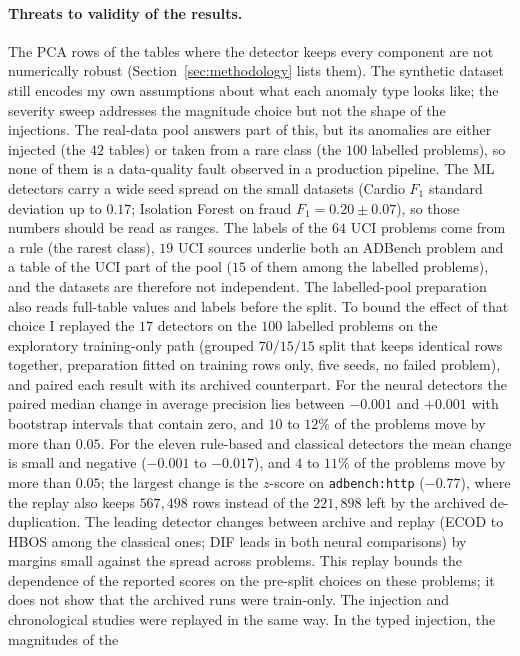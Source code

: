 \documentclass[conference]{IEEEtran}
\begin{document}
\paragraph{Threats to validity of the results.} The PCA rows of the tables where the
detector keeps every component are not numerically robust (Section~\ref{sec:methodology} lists
them). The synthetic dataset still encodes my
own assumptions about what each anomaly type looks like; the severity
sweep addresses the magnitude choice but not the shape of the
injections. The real-data pool answers part of this, but its anomalies are either
injected (the $42$ tables) or taken from a rare class (the $100$ labelled
problems), so none of them is a data-quality fault observed in a production
pipeline. The ML detectors carry a wide seed spread on the
small datasets (Cardio $F_1$ standard deviation up to $0.17$; Isolation
Forest on fraud $F_1 = 0.20 \pm 0.07$), so those numbers should be read
as ranges. The labels of the $64$ UCI problems come from a rule (the rarest
class), $19$ UCI sources underlie both an ADBench problem and a table of the UCI part of the
pool ($15$ of them among the labelled problems), and the datasets are therefore not independent. The labelled-pool preparation also reads full-table
values and labels before the split. To bound the effect of that choice I replayed the $17$
detectors on the $100$ labelled problems on the exploratory training-only path
(grouped $70/15/15$ split that keeps identical rows together, preparation fitted on training rows only, five seeds, no
failed problem), and paired each result with its archived counterpart. For the neural detectors the paired median
change in average precision lies between $-0.001$ and $+0.001$ with bootstrap intervals that contain zero, and
$10$ to $12\%$ of the problems move by more than $0.05$. For the eleven rule-based and classical detectors the
mean change is small and negative ($-0.001$ to $-0.017$), and $4$ to $11\%$ of the problems move by more than $0.05$;
the largest change is the $z$-score on \texttt{adbench:http} ($-0.77$), where the replay also keeps $567{,}498$
rows instead of the $221{,}898$ left by the archived de-duplication. The leading detector changes between archive
and replay (ECOD to HBOS among the classical ones; DIF leads in both neural comparisons) by margins small against
the spread across problems. This replay bounds the dependence of the reported scores on the pre-split choices on
these problems; it does not show that the archived runs were train-only.
The injection and chronological studies were replayed in the same way. In the typed injection, the magnitudes of the
\end{document}
